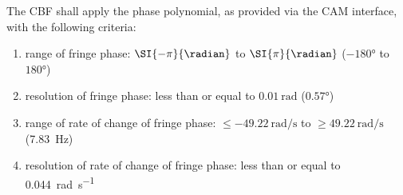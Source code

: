 The CBF shall apply the phase polynomial, as provided via the
CAM interface, with the following criteria:
\begin{enumerate}
\item range of fringe phase: $\SI{-\pi}{\radian}$ to $\SI{\pi}{\radian}$
($\ang{-180}$ to $\ang{+180}$)
\item resolution of fringe phase: less than or equal to $\SI{0.01}{\radian}$
($\ang{0.57}$)
\item range of rate of change of fringe phase: $\le
\SI{-49.22}{\radian\per\second}$ to $\ge \SI{49.22}{\radian\per\second}$
(\SI{7.83}{\hertz})
\item resolution of rate of change of fringe phase: less than or equal to
\SI{0.044}{\radian\per\second}
\end{enumerate}
